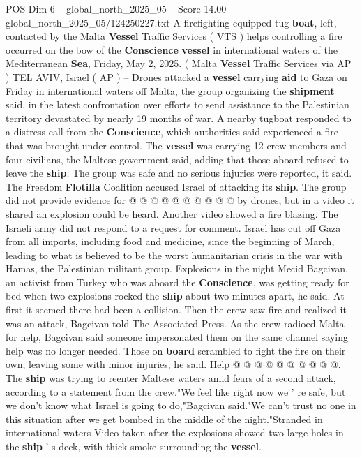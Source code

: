 \begin{textsample}{POS Dim 6 – global\_north\_2025\_05 – Score 14.00 – global\_north\_2025\_05/124250227.txt}  \label{ex:f6_pos_061}
A firefighting-equipped tug \textbf{boat}, left, contacted by the Malta \textbf{Vessel} Traffic Services ( VTS ) helps controlling a fire occurred on the bow of the \textbf{Conscience} \textbf{vessel} in international waters of the Mediterranean \textbf{Sea}, Friday, May 2, 2025. ( Malta \textbf{Vessel} Traffic Services via AP ) TEL AVIV, Israel ( AP ) -- Drones attacked a \textbf{vessel} carrying \textbf{aid} to Gaza on Friday in international waters off Malta, the group organizing the \textbf{shipment} said, in the latest confrontation over efforts to send assistance to the Palestinian territory devastated by nearly 19 months of war.
A nearby tugboat responded to a distress call from the \textbf{Conscience}, which authorities said experienced a fire that was brought under control.
The \textbf{vessel} was carrying 12 crew members and four civilians, the Maltese government said, adding that those aboard refused to leave the \textbf{ship}.
The group was safe and no serious injuries were reported, it said.
The Freedom \textbf{Flotilla} Coalition accused Israel of attacking its \textbf{ship}.
The group did not provide evidence for @ @ @ @ @ @ @ @ @ @ by drones, but in a video it shared an explosion could be heard.
Another video showed a fire blazing.
The Israeli army did not respond to a request for comment.
Israel has cut off Gaza from all imports, including food and medicine, since the beginning of March, leading to what is believed to be the worst humanitarian crisis in the war with Hamas, the Palestinian militant group.
Explosions in the night Mecid Bagcivan, an activist from Turkey who was aboard the \textbf{Conscience}, was getting ready for bed when two explosions rocked the \textbf{ship} about two minutes apart, he said.
At first it seemed there had been a collision.
Then the crew saw fire and realized it was an attack, Bagcivan told The Associated Press.
As the crew radioed Malta for help, Bagcivan said someone impersonated them on the same channel saying help was no longer needed.
Those on \textbf{board} scrambled to fight the fire on their own, leaving some with minor injuries, he said.
Help @ @ @ @ @ @ @ @ @ @.
The \textbf{ship} was trying to reenter Maltese waters amid fears of a second attack, according to a statement from the crew."We feel like right now we ' re safe, but we don't know what Israel is going to do,"Bagcivan said."We can't trust no one in this situation after we get bombed in the middle of the night."Stranded in international waters Video taken after the explosions showed two large holes in the \textbf{ship} ' s deck, with thick smoke surrounding the \textbf{vessel}.

\end{textsample}
